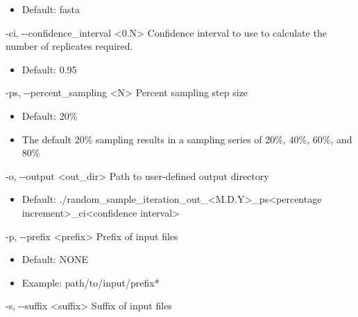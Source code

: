 \documentclass{article}
\begin{document}
\begin{description}
\begin{description}
\begin{description}
\begin{itemize}
                        \item Default: fasta
                    \end{itemize}
                    \item -ci, -\/-confidence\_interval \hspace{0.2cm} <0.N> \hspace{0.2cm} Confidence interval to use to calculate the number of replicates required.
                    \begin{itemize}
                        \item Default: 0.95
                    \end{itemize}
                    \item -ps, -\/-percent\_sampling \hspace{0.2cm} <N> \hspace{0.2cm} Percent sampling step size
                    \begin{itemize}
                        \item Default: 20\%
                        \item The default 20\% sampling results in a sampling series of 20\%, 40\%, 60\%, and 80\%
                    \end{itemize}
                    \item -o, -\/-output \hspace{0.2cm} <out\_dir> \hspace{0.2cm} Path to user-defined output directory
                    \begin{itemize}
                        \item Default: \small{./random\_sample\_iteration\_out\_<M.D.Y>\_ps<percentage increment>\_ci<confidence interval>}
                    \end{itemize}
                    \item -p, -\/-prefix \hspace{0.2cm} <prefix> \hspace{0.2cm} Prefix of input files
                    \begin{itemize}
                        \item Default: NONE
                        \item Example: path/to/input/prefix*
                    \end{itemize}
                    \item -s, -\/-suffix \hspace{0.2cm} <suffix> \hspace{0.2cm} Suffix of input files

\end{description}
\end{description}
\end{description}
\end{document}
